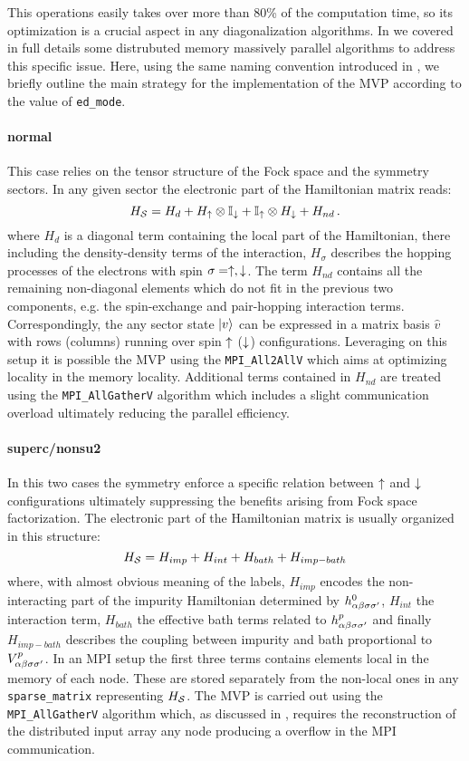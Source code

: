 \documentclass[edipack2.tex]{subfiles}
\begin{document}
This operations easily takes over more than 80\% of the computation
time, so its optimization is a crucial aspect in any diagonalization
algorithms. In  we covered in full details
some distrubuted memory massively parallel algorithms to address this
specific issue.
Here, using the same naming convention introduced in \cite{Amaricci2022}, 
we briefly outline the main strategy for the implementation of the MVP
according to the value of {\tt ed\_mode}.


\paragraph{{\bf normal}}
This case relies on the tensor structure of the Fock space and the
symmetry sectors. In any given sector the electronic part of the
Hamiltonian matrix reads:
\begin{equation}
H_{\cal S} = H_d  + H_\uparrow\otimes \mathbb{I}_\downarrow + \mathbb{I}_\uparrow\otimes
H_\downarrow + H_{nd}\,.
\label{HssNormal}
\end{equation}
where $H_d$ is a diagonal term containing the local part of the
Hamiltonian, there including the density-density terms of the
interaction,  $H_\sigma$ describes the hopping processes of the
electrons with spin $\sigma=\uparrow,\downarrow$.
The term $H_{nd}$ contains all the remaining non-diagonal
elements which do not fit in the previous two components,
e.g. the spin-exchange and pair-hopping interaction terms.
Correspondingly, the any sector state $|v\rangle$ can be expressed in a matrix
basis $\hat{v}$ with rows (columns) running over spin $\uparrow$ ($\downarrow$)
configurations. Leveraging on this setup it is possible the MVP using the 
{\tt MPI\_All2AllV} which aims at optimizing locality in the memory
locality. Additional terms contained in $H_{nd}$ are treated using the
{\tt MPI\_AllGatherV} algorithm which includes a slight communication
overload ultimately reducing the parallel efficiency.  


\paragraph{{\bf superc/nonsu2}}
In this two cases the symmetry enforce a specific relation between $\uparrow$ and
$\downarrow$ configurations ultimately suppressing the benefits arising from
Fock space factorization.
The electronic part of the Hamiltonian matrix is usually organized in this structure:
$$
H_{\cal S} = H_{imp} + H_{int} + H_{bath} + H_{imp-bath} 
$$
where, with almost obvious meaning of the labels, $H_{imp}$ encodes
the non-interacting part of the impurity Hamiltonian determined by
$h^0_{\alpha\beta\sigma\sigma'}$, $H_{int}$ the interaction term, $H_{bath}$ the
effective bath terms related to $h^p_{\alpha\beta\sigma\sigma'}$ and finally
$H_{imp-bath}$ describes the coupling between impurity and bath
proportional to $V^p_{\alpha\beta\sigma\sigma'}$. 
In an MPI setup the first three terms contains elements local in the
memory of each node. These are stored separately from the non-local
ones in any {\tt sparse\_matrix} representing $H_{\cal S}$. 
The MVP is carried out using the {\tt MPI\_AllGatherV} algorithm
which, as discussed in , requires the
reconstruction of the distributed input array any node producing a
overflow in the MPI communication.  
\end{document}
